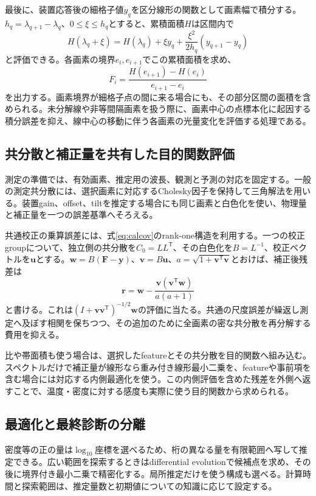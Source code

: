 最後に、装置応答後の細格子値$y_q$を区分線形の関数として画素幅で積分する。$h_q=\lambda_{q+1}-\lambda_q$、$0\leq\xi\leq h_q$とすると、累積面積$H$は区間内で
\begin{equation}
H(\lambda_q+\xi)=H(\lambda_q)+\xi y_q+
\frac{\xi^2}{2h_q}\left(y_{q+1}-y_q\right)
\label{eq:antiderivative}
\end{equation}
と評価できる。各画素の境界$e_i,e_{i+1}$でこの累積面積を求め、
\begin{equation}
F_i=\frac{H(e_{i+1})-H(e_i)}{e_{i+1}-e_i}
\label{eq:bin-average-numeric}
\end{equation}
を出力する。画素境界が細格子点の間に来る場合にも、その部分区間の面積を含められる。未分解線や非等間隔画素を扱う際に、画素中心の点標本化に起因する積分誤差を抑え、線中心の移動に伴う各画素の光量変化を評価する処理である。

\subsection{共分散と補正量を共有した目的関数評価}
測定の準備では、有効画素、推定用の波長、観測と予測の対応を固定する。一般の測定共分散には、選択画素に対応するCholesky因子を保持して三角解法を用いる。装置gain、offset、tiltを推定する場合にも同じ画素と白色化を使い、物理量と補正量を一つの誤差基準へそろえる。

共通校正の乗算誤差には、式\eqref{eq:calcov}のrank-one構造を利用する。一つの校正groupについて、独立側の共分散を$C_0=LL^{\mathsf T}$、その白色化を$B=L^{-1}$、校正ベクトルを$\boldsymbol u$とする。$\boldsymbol w=B(\boldsymbol F-\boldsymbol y)$、$\boldsymbol v=B\boldsymbol u$、$a=\sqrt{1+\boldsymbol v^{\mathsf T}\boldsymbol v}$とおけば、補正後残差は
\begin{equation}
\boldsymbol r=\boldsymbol w-
\frac{\boldsymbol v\left(\boldsymbol v^{\mathsf T}\boldsymbol w\right)}{a(a+1)}
\label{eq:rank-one-whitening}
\end{equation}
と書ける。これは$(I+\boldsymbol v\boldsymbol v^{\mathsf T})^{-1/2}\boldsymbol w$の評価に当たる。共通の尺度誤差が繰返し測定へ及ぼす相関を保ちつつ、その追加のために全画素の密な共分散を再分解する費用を抑える。

比や帯面積も使う場合は、選択したfeatureとその共分散を目的関数へ組み込む。スペクトルだけで補正量が線形なら重み付き線形最小二乗を、featureや事前項を含む場合には対応する内側最適化を使う。この内側評価を含めた残差を外側へ返すことで、温度・密度に対する感度も実際に使う目的関数から求められる。

\subsection{最適化と最終診断の分離}
密度等の正の量は$\log_{10}$座標を選べるため、桁の異なる量を有限範囲へ写して推定できる。広い範囲を探索するときはdifferential evolutionで候補点を求め、その後に境界付き最小二乗で精密化する。局所推定だけを使う構成も選べる。計算時間と探索範囲は、推定量数と初期値についての知識に応じて設定する。

